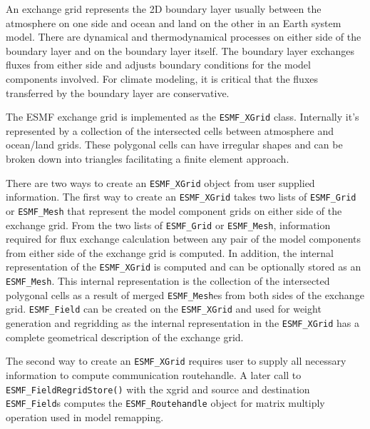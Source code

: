 
\label{sec:xgrid:desc}
An exchange grid represents the 2D boundary layer usually between the
atmosphere on one side and ocean and land on the other in an Earth
system model. There are dynamical and thermodynamical processes on
either side of the boundary layer and on the boundary layer itself.
The boundary layer exchanges fluxes from either side and adjusts
boundary conditions for the model components involved. For climate modeling,
it is critical that the fluxes transferred by the boundary layer are
conservative.

The ESMF exchange grid is implemented as the {\tt ESMF\_XGrid} class. 
Internally it's represented by a collection of the intersected cells
between atmosphere and ocean/land\cite{BalajiXGrid} grids. 
These polygonal cells can have irregular shapes
and can be broken down into triangles facilitating a finite element
approach. 

There are two ways to create an {\tt ESMF\_XGrid} object from
user supplied information. The first way to create an {\tt ESMF\_XGrid} takes
two lists of {\tt ESMF\_Grid} or {\tt ESMF\_Mesh} that represent the model component grids on
either side of the exchange grid. From the two lists of {\tt ESMF\_Grid} or {\tt ESMF\_Mesh},
information required for flux exchange calculation between any pair of the 
model components from either side of the exchange grid is computed. In addition, the
internal representation of the {\tt ESMF\_XGrid} is computed and can be optionally stored
as an {\tt ESMF\_Mesh}. This internal representation is the collection of the intersected
polygonal cells as a result of merged {\tt ESMF\_Mesh}es from both sides of the exchange grid.
{\tt ESMF\_Field} can be created on the {\tt ESMF\_XGrid} and used for weight generation
and regridding as the internal representation in the {\tt ESMF\_XGrid} has
a complete geometrical description of the exchange grid.

The second way 
to create an {\tt ESMF\_XGrid} requires user to supply all necessary information 
to compute communication routehandle. A later
call to {\tt ESMF\_FieldRegridStore()} with the xgrid and source and destination
{\tt ESMF\_Field}s computes the {\tt ESMF\_Routehandle} object for matrix
multiply operation used in model remapping. 

